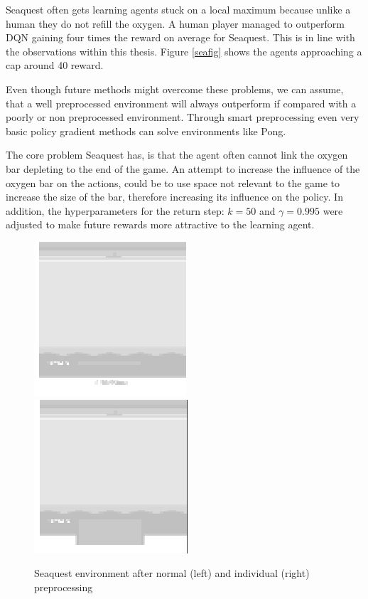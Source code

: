 Seaquest often gets learning agents stuck on a local maximum because unlike a human they do not refill the oxygen.
A human player managed to outperform DQN \citep{nature} gaining four times the reward on average for Seaquest.
This is in line with the observations within this thesis. Figure \ref{seafig} shows the agents approaching a cap around 40 reward.

Even though future methods might overcome these problems, we can assume, that a well preprocessed environment will always outperform if compared with a poorly or non preprocessed environment.
Through smart preprocessing even very basic policy gradient methods can solve environments like Pong.  \citep{karpathy}

The core problem Seaquest has, is that the agent often cannot link the oxygen bar depleting to the end of the game. 
An attempt to increase the influence of the oxygen bar on the actions, could be to use space not relevant to the game to increase the size of the bar, therefore increasing its influence on the policy.
In addition, the hyperparameters for the return step: $k=50$ and $\gamma =0.995$ were adjusted to make future rewards more attractive to the learning agent.

\begin{figure}[h]
\includegraphics[scale=1]{bilder/seaquestgamenopre.png}
\includegraphics[scale=1]{bilder/seaquestgameprepro.png}
\caption{Seaquest environment after normal (left) and individual (right) preprocessing}
\end{figure}

